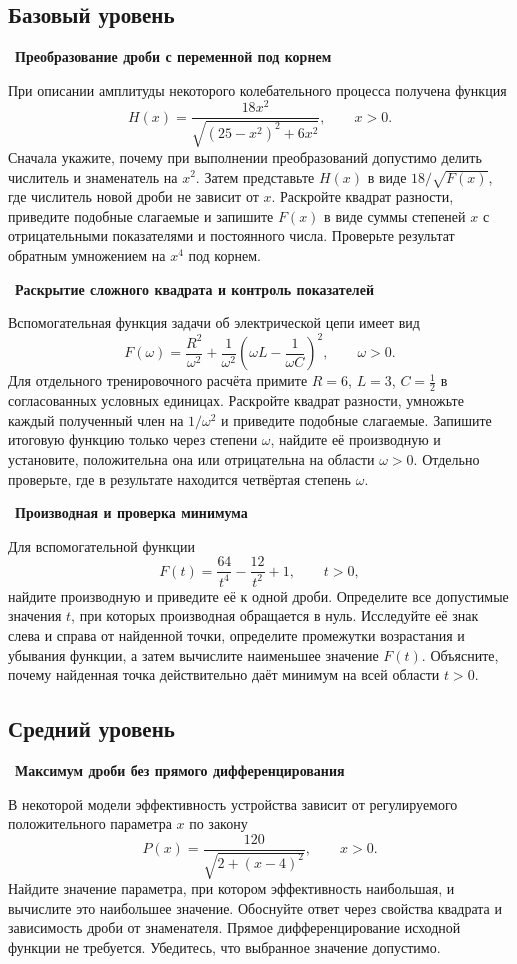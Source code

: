 \documentclass[a4paper,12pt]{article}
\newcommand{\task}[2]{\Needspace{12\baselineskip}\par\medskip\noindent{\color{darkaccent}\bfseries Задача~#1.}~\textbf{#2}\par\smallskip}
\begin{document}
\subsection*{Базовый уровень}
\task{1}{Преобразование дроби с переменной под корнем}
При описании амплитуды некоторого колебательного процесса получена функция
\[
H(x)=\frac{18x^2}{\sqrt{(25-x^2)^2+6x^2}},\qquad x>0.
\]
Сначала укажите, почему при выполнении преобразований допустимо делить числитель и знаменатель на $x^2$. Затем представьте $H(x)$ в виде $18/\sqrt{F(x)}$, где числитель новой дроби не зависит от $x$. Раскройте квадрат разности, приведите подобные слагаемые и запишите $F(x)$ в виде суммы степеней $x$ с отрицательными показателями и постоянного числа. Проверьте результат обратным умножением на $x^4$ под корнем.

\task{2}{Раскрытие сложного квадрата и контроль показателей}
Вспомогательная функция задачи об электрической цепи имеет вид
\[
F(\omega)=\frac{R^2}{\omega^2}
+\frac{1}{\omega^2}\left(\omega L-\frac{1}{\omega C}\right)^2,
\qquad \omega>0.
\]
Для отдельного тренировочного расчёта примите $R=6$, $L=3$, $C=\tfrac12$ в согласованных условных единицах. Раскройте квадрат разности, умножьте каждый полученный член на $1/\omega^2$ и приведите подобные слагаемые. Запишите итоговую функцию только через степени $\omega$, найдите её производную и установите, положительна она или отрицательна на области $\omega>0$. Отдельно проверьте, где в результате находится четвёртая степень $\omega$.

\task{3}{Производная и проверка минимума}
Для вспомогательной функции
\[
F(t)=\frac{64}{t^4}-\frac{12}{t^2}+1,\qquad t>0,
\]
найдите производную и приведите её к одной дроби. Определите все допустимые значения $t$, при которых производная обращается в нуль. Исследуйте её знак слева и справа от найденной точки, определите промежутки возрастания и убывания функции, а затем вычислите наименьшее значение $F(t)$. Объясните, почему найденная точка действительно даёт минимум на всей области $t>0$.

\subsection*{Средний уровень}
\task{4}{Максимум дроби без прямого дифференцирования}
В некоторой модели эффективность устройства зависит от регулируемого положительного параметра $x$ по закону
\[
P(x)=\frac{120}{\sqrt{2+(x-4)^2}},\qquad x>0.
\]
Найдите значение параметра, при котором эффективность наибольшая, и вычислите это наибольшее значение. Обоснуйте ответ через свойства квадрата и зависимость дроби от знаменателя. Прямое дифференцирование исходной функции не требуется. Убедитесь, что выбранное значение допустимо.
\end{document}
